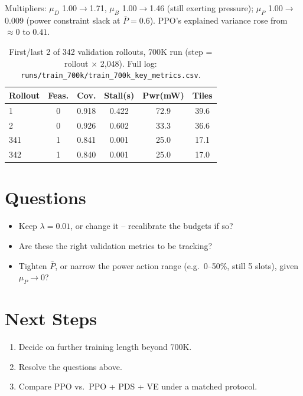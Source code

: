\documentclass[10pt,conference]{IEEEtran}
\begin{document}
\noindent Multipliers: $\mu_D$ 1.00$\to$1.71, $\mu_B$ 1.00$\to$1.46 (still exerting pressure); $\mu_P$ 1.00$\to$0.009 (power constraint slack at $\bar P=0.6$). PPO's explained variance rose from $\approx0$ to $0.41$.

\begin{table}[H]
\centering
\scriptsize
\begin{tabular}{lccccc}
\toprule
Rollout & Feas. & Cov. & Stall(s) & Pwr(mW) & Tiles \\
\midrule
1   & 0 & 0.918 & 0.422 & 72.9 & 39.6 \\
2   & 0 & 0.926 & 0.602 & 33.3 & 36.6 \\
341 & 1 & 0.841 & 0.001 & 25.0 & 17.1 \\
342 & 1 & 0.840 & 0.001 & 25.0 & 17.0 \\
\bottomrule
\end{tabular}
\caption{First/last 2 of 342 validation rollouts, 700K run (step = rollout $\times$ 2{,}048). Full log: \texttt{runs/train\_700k/train\_700k\_key\_metrics.csv}.}
\label{tab:rollouts}
\end{table}

\section{Questions}
\begin{itemize}
    \item Keep $\lambda=0.01$, or change it -- recalibrate the budgets if so?
    \item Are these the right validation metrics to be tracking?
    \item Tighten $\bar P$, or narrow the power action range (e.g.\ 0--50\%, still 5 slots), given $\mu_P\to0$?
\end{itemize}

\section{Next Steps}
\begin{enumerate}
    \item Decide on further training length beyond 700K.
    \item Resolve the questions above.
    \item Compare PPO vs.\ PPO + PDS + VE under a matched protocol.
\end{enumerate}
\end{document}
